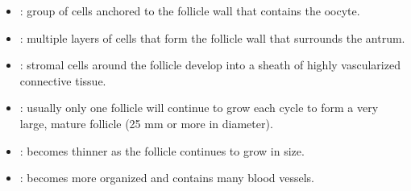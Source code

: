 \begin{multicols}{2}
\begin{itemize}
  \begin{center}
  \end{center}
  
  \item {}: group of cells anchored to the follicle wall that contains the oocyte.
  
  \begin{center}
  \end{center}
  
  \item {}: multiple layers of cells that form the follicle wall that surrounds the antrum. 
  
  \begin{center}
  \end{center}
  
  \item {}: stromal cells around the follicle develop into a sheath of highly vascularized connective tissue. 
  
  \begin{center}
  \end{center}
  
  \item {}: usually only one follicle will continue to grow each cycle to form a very large, mature follicle (25 mm or more in diameter). 
  
  \begin{center}
  \end{center}

  \item {}: becomes thinner as the follicle continues to grow in size.
  
  \begin{center}
  \end{center}
  
  \item {}: becomes more organized and contains many blood vessels.
  
  \begin{center}
  \end{center}
  

\end{itemize}
\end{multicols}
